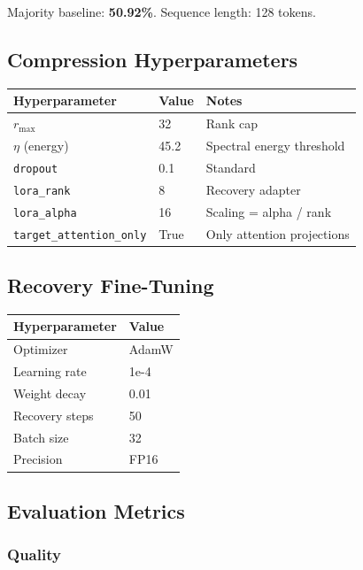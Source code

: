 Majority baseline: \textbf{50.92\%}. Sequence length: 128 tokens.

\subsection{Compression Hyperparameters}

\begin{table}[H]
\centering
\small
\begin{tabular}{lll}
\toprule
\textbf{Hyperparameter} & \textbf{Value} & \textbf{Notes} \\
\midrule
$r_\text{max}$ & 32 & Rank cap \\
$\eta$ (energy) & 45.2 & Spectral energy threshold \\
\texttt{dropout} & 0.1 & Standard \\
\texttt{lora\_rank} & 8 & Recovery adapter \\
\texttt{lora\_alpha} & 16 & Scaling = alpha / rank \\
\texttt{target\_attention\_only} & True & Only attention projections \\
\bottomrule
\end{tabular}
\end{table}

\subsection{Recovery Fine-Tuning}

\begin{table}[H]
\centering
\small
\begin{tabular}{ll}
\toprule
\textbf{Hyperparameter} & \textbf{Value} \\
\midrule
Optimizer & AdamW \\
Learning rate & 1e-4 \\
Weight decay & 0.01 \\
Recovery steps & 50 \\
Batch size & 32 \\
Precision & FP16 \\
\bottomrule
\end{tabular}
\end{table}

\subsection{Evaluation Metrics}

\subsubsection{Quality}

